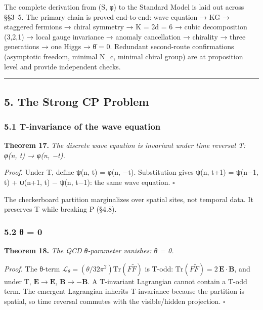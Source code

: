 \documentclass[
]{article}
\begin{document}
The complete derivation from (S, φ) to the Standard Model is laid out
across §§3--5. The primary chain is proved end-to-end: wave equation →
KG → staggered fermions → chiral symmetry → K = 2d = 6 → cubic
decomposition (3,2,1) → local gauge invariance → anomaly cancellation →
chirality → three generations → one Higgs → θ̄ = 0. Redundant
second-route confirmations (asymptotic freedom, minimal N\_c, minimal
chiral group) are at proposition level and provide independent checks.

\begin{center}\rule{0.5\linewidth}{0.5pt}\end{center}

\hypertarget{the-strong-cp-problem}{%
\subsection{5. The Strong CP Problem}\label{the-strong-cp-problem}}

\hypertarget{t-invariance-of-the-wave-equation}{%
\subsubsection{5.1 T-invariance of the wave
equation}\label{t-invariance-of-the-wave-equation}}

\textbf{Theorem 17.} \emph{The discrete wave equation is invariant under
time reversal T: φ(n, t) → φ(n, −t).}

\emph{Proof.} Under T, define ψ(n, t) = φ(n, −t). Substitution gives
ψ(n, t+1) = ψ(n−1, t) + ψ(n+1, t) − ψ(n, t−1): the same wave equation.
\(\square\)

The checkerboard partition marginalizes over spatial sites, not temporal
data. It preserves T while breaking P (§4.8).

\hypertarget{ux3b8-0}{%
\subsubsection{5.2 θ = 0}\label{ux3b8-0}}

\textbf{Theorem 18.} \emph{The QCD θ-parameter vanishes: θ = 0.}

\emph{Proof.} The θ-term
\(\mathcal{L}_\theta = (\theta/32\pi^2) \mathrm{Tr}(F \tilde{F})\) is
T-odd: \(\mathrm{Tr}(F\tilde{F}) = 2\,\mathbf{E} \cdot \mathbf{B}\), and
under T, \(\mathbf{E} \to \mathbf{E}\), \(\mathbf{B} \to -\mathbf{B}\).
A T-invariant Lagrangian cannot contain a T-odd term. The emergent
Lagrangian inherits T-invariance because the partition is spatial, so
time reversal commutes with the visible/hidden projection. \(\square\)
\end{document}
